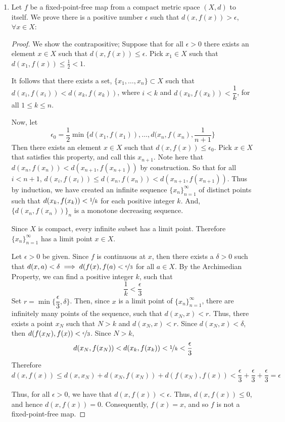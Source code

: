 \documentclass{book}
\begin{document}
\begin{enumerate}[(1)]
    \item Let $f$ be a fixed-point-free map from a compact metric space $(X,d)$ to itself. We prove there is a positive number $\epsilon$ such that $d(x,f(x)) > \epsilon$, $\forall x\in X$: 
        \begin{proof} We show the contrapositive; Suppose that for all $\epsilon>0$ there exists an element $x \in X$ such that $d(x,f(x)) \leq \epsilon$. Pick $x_1\in X$ such that $d(x_1,f(x)) \leq \frac{1}{2} < 1$.
            \par It follows that there exists a set, $\{x_1,\dots,x_n\}\subset X$ such that $d(x_i,f(x_i)) <d(x_k,f(x_k))$, where $i<k$ and $d(x_k,f(x_k))<\dfrac{1}{k}$, for all $1\leq k\leq n$.
            \par Now, let 
            $$\epsilon_0 = \dfrac{1}{2}\min \Big\{d(x_1,f(x_1)),\dots,d(x_n,f(x_n),\frac{1}{n+1}\Big\}$$
            Then there exists an element $x\in X$ such that $d(x,f(x))\leq\epsilon_0$. Pick $x\in X$ that satisfies this property, and call this $x_{n+1}$. Note here that $d(x_n,f(x_n)) < d(x_{n+1},f(x_{n+1}))$ by construction. So that for all $i<n+1$, $d(x_i,f(x_i))\leq d(x_n,f(x_n))< d(x_{n+1},f(x_{n+1}))$. Thus by induction, we have created an infinite sequence $\{x_n\}_{n = 1}^\infty$ of distinct points such that $d(x_k,f(x_k))<\nicefrac{1}{k}$ for each positive integer $k$. And, $\{d(x_n,f(x_n))\}_n$ is a monotone decreasing sequence.
            \par Since $X$ is compact, every infinite subset has a limit point. Therefore $\{x_n\}_{n=1}^\infty $ has a limit point $x \in X$. 
            \par Let $\epsilon > 0$ be given. Since $f$ is continuous at $x$, then there exists a $\delta >0$ such that $d(x,a)<\delta\implies d(f(x),f(a)<\nicefrac{\epsilon}{3}$ for all $a\in X$. By the Archimedian Property, we can find a positive integer $k$, such that 
            $$\frac{1}{k}<\frac{\epsilon}{3}$$
            Set $r= \min\{\dfrac{\epsilon}{3},\delta\}$. Then, since $x$ is a limit point of $\{x_n\}_{n = 1}^\infty$, there are infinitely many points of the sequence, such that $d(x_N,x)<r$. Thus, there exists a point $x_N$ such that $N>k$ and $d(x_N,x)<r$. Since $d(x_N,x)<\delta$, then $d(f(x_N),f(x))<\nicefrac{\epsilon}{3}$. Since $N>k$,  $$d(x_N,f(x_N)) < d(x_k,f(x_k)) < \nicefrac{1}{k} < \frac{\epsilon}{3}$$
            Therefore $$d(x,f(x))\leq d(x,x_N)+d(x_N,f(x_N))+d(f(x_N),f(x))<\frac{\epsilon}{3}+\frac{\epsilon}{3}+\frac{\epsilon}{3}=\epsilon$$
            \par Thus, for all $\epsilon>0$, we have that $d(x,f(x))<\epsilon$. Thus, $d(x,f(x)) \leq 0$, and hence $d(x,f(x))=0$. Consequently, $f(x)=x$, and so $f$ is not a fixed-point-free map.
        \end{proof}


\end{enumerate}
\end{document}
